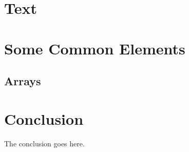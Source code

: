 \documentclass[lettersize,journal]{IEEEtran}
\begin{document}
\section{Text}



\section{Some Common Elements}

\subsection{Arrays}



\section{Conclusion}
The conclusion goes here.


 


\end{document}

